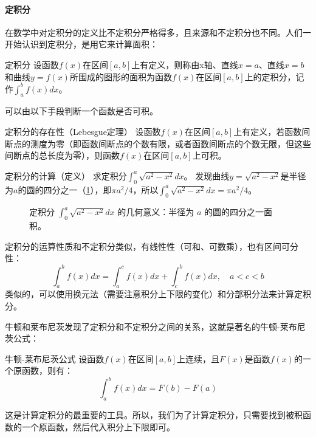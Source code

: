 \paragraph{定积分}

在数学中对定积分的定义比不定积分严格得多，且来源和不定积分也不同。人们一开始认识到定积分，是用它来计算面积：
\begin{definition}{定积分}{}
    设函数$f(x)$在区间$[a, b]$上有定义，则称由x轴、直线$x = a$、直线$x = b$和曲线$y = f(x)$所围成的图形的面积为函数$f(x)$在区间$[a, b]$上的定积分，记作$\int_a^b f(x) dx$。
\end{definition}

可以由以下手段判断一个函数是否可积。
\begin{theorem}{定积分的存在性（Lebesgue定理）}{}
    设函数$f(x)$在区间$[a, b]$上有定义，若函数间断点的测度为零（即函数间断点的个数有限，或者函数间断点的个数无限，但这些间断点的总长度为零），则函数$f(x)$在区间$[a, b]$上可积。
\end{theorem}

\begin{example}{定积分的计算（定义）}{}
    求定积分$\int_0^a \sqrt{a^2 - x^2} dx$。
    \tcblower
    发现曲线$y = \sqrt{a^2 - x^2}$是半径为$a$的圆的四分之一（\cref{fig:quarter_circle_integral}），即$\pi a^2 / 4$，所以$\int_0^a \sqrt{a^2 - x^2} dx = \pi a^2 / 4$。
\end{example}

\begin{figure}
    \centering
    
    \caption{定积分 $\int_0^a \sqrt{a^2 - x^2} dx$ 的几何意义：半径为 $a$ 的圆的四分之一面积。}
    \label{fig:quarter_circle_integral}
\end{figure}

定积分的运算性质和不定积分类似，有线性性（可和、可数乘），也有区间可分性：
\begin{equation}
    \int_a^b f(x) dx = \int_a^c f(x) dx + \int_c^b f(x) dx, \quad a < c < b
\end{equation}
类似的，可以使用换元法（需要注意积分上下限的变化）和分部积分法来计算定积分。

牛顿和莱布尼茨发现了定积分和不定积分之间的关系，这就是著名的牛顿-莱布尼茨公式：
\begin{theorem}{牛顿-莱布尼茨公式}{}
    设函数$f(x)$在区间$[a, b]$上连续，且$F(x)$是函数$f(x)$的一个原函数，则有：
    \begin{equation}
        \int_a^b f(x) dx = F(b) - F(a)
    \end{equation}
\end{theorem}
这是计算定积分的最重要的工具。所以，我们为了计算定积分，只需要找到被积函数的一个原函数，然后代入积分上下限即可。

